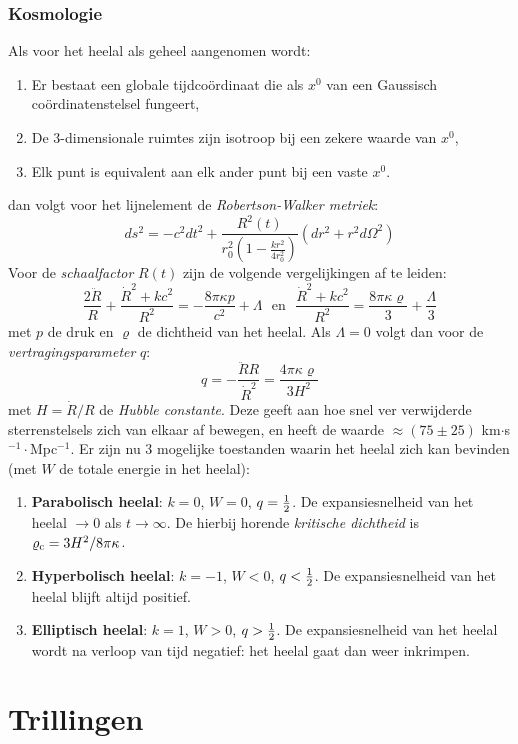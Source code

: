 \documentclass[twoside]{report}
\begin{document}
\subsection{Kosmologie}
Als voor het heelal als geheel aangenomen wordt:
\begin{enumerate}
\item Er bestaat een globale tijdco\"ordinaat die als $x^0$ van een Gaussisch
      co\"ordinatenstelsel fungeert,
\item De 3-dimensionale ruimtes zijn isotroop bij een zekere waarde van $x^0$,
\item Elk punt is equivalent aan elk ander punt bij een vaste $x^0$.
\end{enumerate}
dan volgt voor het lijnelement de {\it Robertson-Walker metriek}:
\[
ds^2=-c^2dt^2+\frac{R^2(t)}{r_0^2\left(1-\displaystyle\frac{kr^2}{4r_0^2}\right)}(dr^2+r^2d\Omega^2)
\]
Voor de {\it schaalfactor} $R(t)$ zijn de volgende vergelijkingen af te
leiden:
\[
\frac{2\ddot{R}}{R}+\frac{\dot{R}^2+kc^2}{R^2}=-\frac{8\pi\kappa p}{c^2}+\Lambda
~~~\mbox{en}~~~
\frac{\dot{R}^2+kc^2}{R^2}=\frac{8\pi\kappa\varrho}{3}+\frac{\Lambda}{3}
\]
met $p$ de druk en $\varrho$ de dichtheid van het heelal. Als $\Lambda=0$
volgt dan voor de {\it vertragingsparameter} $q$:
\[
q=-\frac{\ddot{R}R}{\dot{R}^2}=\frac{4\pi\kappa\varrho}{3H^2}
\]
met $H=\dot{R}/R$ de {\it Hubble constante}. Deze geeft aan hoe snel ver
verwijderde sterrenstelsels zich van elkaar af bewegen, en heeft de waarde
$\approx(75\pm25)$ km$\cdot$s$^{-1}\cdot$Mpc$^{-1}$. Er zijn nu 3 mogelijke
toestanden waarin het heelal zich kan bevinden (met $W$ de totale energie in
het heelal):
\begin{enumerate}
\item {\bf Parabolisch heelal}: $k=0$, $W=0$, $q=\mbox{$\frac{1}{2}$}$. De expansiesnelheid
      van het heelal $\rightarrow0$ als $t\rightarrow\infty$. De hierbij
      horende {\it kritische dichtheid} is $\varrho_{\rm c}=3H^2/8\pi\kappa$.
\item {\bf Hyperbolisch heelal}: $k=-1$, $W<0$, $q<\mbox{$\frac{1}{2}$}$. De expansiesnelheid
      van het heelal blijft altijd positief.
\item {\bf Elliptisch heelal}: $k=1$, $W>0$, $q>\mbox{$\frac{1}{2}$}$. De expansiesnelheid
      van het heelal wordt na verloop van tijd negatief: het heelal gaat dan
      weer inkrimpen.
\end{enumerate}

\chapter{Trillingen}
\end{document}
